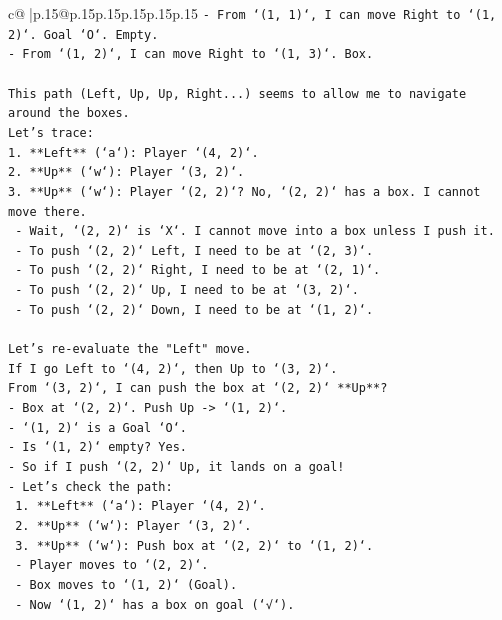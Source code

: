\documentclass{article}
\begin{document}
{\begin{supertabular}{c@{$\;$}|p{.15\linewidth}@{}p{.15\linewidth}p{.15\linewidth}p{.15\linewidth}p{.15\linewidth}p{.15\linewidth}}
{{{\texttt{{-} From `(1, 1)`, I can move Right to `(1, 2)`. Goal `O`. Empty.} \\
\texttt{{-} From `(1, 2)`, I can move Right to `(1, 3)`. Box.} \\
\\ 
\texttt{This path (Left, Up, Up, Right...) seems to allow me to navigate around the boxes.} \\
\texttt{Let's trace:} \\
\texttt{1. **Left** (`a`): Player `(4, 2)`.} \\
\texttt{2. **Up** (`w`): Player `(3, 2)`.} \\
\texttt{3. **Up** (`w`): Player `(2, 2)`? No, `(2, 2)` has a box. I cannot move there.} \\
\texttt{   {-} Wait, `(2, 2)` is `X`. I cannot move into a box unless I push it.} \\
\texttt{   {-} To push `(2, 2)` Left, I need to be at `(2, 3)`.} \\
\texttt{   {-} To push `(2, 2)` Right, I need to be at `(2, 1)`.} \\
\texttt{   {-} To push `(2, 2)` Up, I need to be at `(3, 2)`.} \\
\texttt{   {-} To push `(2, 2)` Down, I need to be at `(1, 2)`.} \\
\\ 
\texttt{Let's re{-}evaluate the "Left" move.} \\
\texttt{If I go Left to `(4, 2)`, then Up to `(3, 2)`.} \\
\texttt{From `(3, 2)`, I can push the box at `(2, 2)` **Up**?} \\
\texttt{{-} Box at `(2, 2)`. Push Up {-}> `(1, 2)`.} \\
\texttt{{-} `(1, 2)` is a Goal `O`.} \\
\texttt{{-} Is `(1, 2)` empty? Yes.} \\
\texttt{{-} So if I push `(2, 2)` Up, it lands on a goal!} \\
\texttt{{-} Let's check the path:} \\
\texttt{  1. **Left** (`a`): Player `(4, 2)`.} \\
\texttt{  2. **Up** (`w`): Player `(3, 2)`.} \\
\texttt{  3. **Up** (`w`): Push box at `(2, 2)` to `(1, 2)`.} \\
\texttt{     {-} Player moves to `(2, 2)`.} \\
\texttt{     {-} Box moves to `(1, 2)` (Goal).} \\
\texttt{     {-} Now `(1, 2)` has a box on goal (`√`).} \\
}}}
\end{supertabular}}
\end{document}

